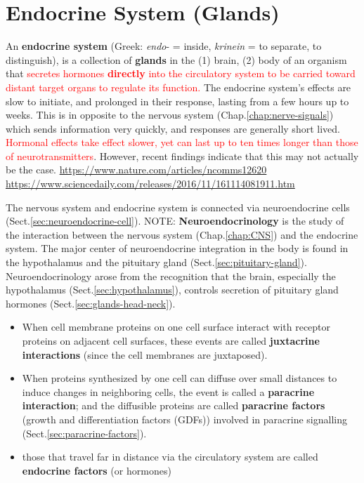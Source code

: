 \chapter{Endocrine System (Glands)}
\label{chap:Endocrine-System}
\label{chap:Glands}

An {\bf endocrine system} (Greek: {\it endo}- = inside, {\it krinein} = to
separate, to distinguish), is a collection of {\bf glands} in the (1) brain, (2)
body of an organism that \textcolor{red}{secretes hormones {\bf directly} into
the circulatory system to be carried toward distant target organs to regulate
its function.} The endocrine system's effects are slow to initiate, and
prolonged in their response, lasting from a few hours up to weeks.
This is in opposite to the nervous system (Chap.\ref{chap:nerve-signals}) which
sends information very quickly, and responses are generally short lived.
\textcolor{red}{Hormonal effects take effect slower, yet can last up to ten
times longer than those of neurotransmitters}. 
However, recent findings indicate that this may not actually be the case.
\url{https://www.nature.com/articles/ncomms12620}
\url{https://www.sciencedaily.com/releases/2016/11/161114081911.htm}

The nervous system and endocrine system is connected via neuroendocrine cells
(Sect.\ref{sec:neuroendocrine-cell}).
NOTE: {\bf Neuroendocrinology} is the study of the interaction between the
nervous system (Chap.\ref{chap:CNS}) and the endocrine system.
The major center of neuroendocrine integration in the body is found in the
hypothalamus and the pituitary gland (Sect.\ref{sec:pituitary-gland}).
Neuroendocrinology arose from the recognition that the brain, especially the
hypothalamus (Sect.\ref{sec:hypothalamus}), controls secretion of pituitary
gland hormones (Sect.\ref{sec:glands-head-neck}).

\begin{itemize}
  \item When cell membrane proteins on one cell surface interact with receptor
  proteins on adjacent cell surfaces, these events are called {\bf juxtacrine
  interactions} (since the cell membranes are juxtaposed).

  \item When proteins synthesized by one cell can diffuse over small distances
  to induce changes in neighboring cells, the event is called a {\bf paracrine
  interaction}; and the diffusible proteins are called {\bf paracrine factors}
  (growth and differentiation factors (GDFs)) involved in paracrine signalling
  (Sect.\ref{sec:paracrine-factors}).
  

  \item those that travel far in distance via the circulatory system are called
  {\bf endocrine factors} (or hormones)
  
\end{itemize}

